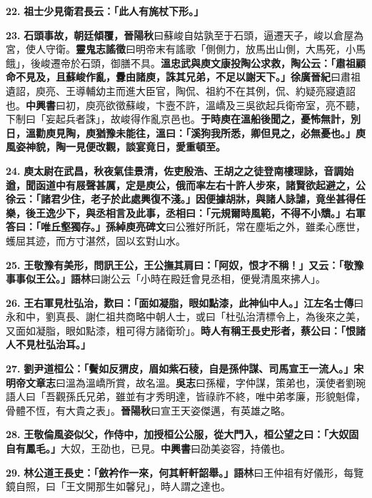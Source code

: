 \textbf{22.} \textbf{祖士少見衛君長云：「此人有旄杖下形。」}

\textbf{23.} \textbf{石頭事故，朝廷傾覆，}{\footnotesize \textbf{晉陽秋}曰蘇峻自姑孰至于石頭，逼遷天子，峻以倉屋為宮，使人守衛。\textbf{靈鬼志謠徵}曰明帝末有謠歌「側側力，放馬出山側，大馬死，小馬餓」，後峻遷帝於石頭，御膳不具。}\textbf{溫忠武與庾文康投陶公求救，陶公云：「肅祖顧命不見及，且蘇峻作亂，釁由諸庾，誅其兄弟，不足以謝天下。」}{\footnotesize \textbf{徐廣晉紀}曰肅祖遺詔，庾亮、王導輔幼主而進大臣官，陶侃、祖約不在其例，侃、約疑亮寢遺詔也。\textbf{中興書}曰初，庾亮欲徵蘇峻，卞壼不許，溫嶠及三吳欲起兵衛帝室，亮不聽，下制曰「妄起兵者誅」，故峻得作亂京邑也。}\textbf{于時庾在溫船後聞之，憂怖無計，別日，溫勸庾見陶，庾猶豫未能往，溫曰：「溪狗我所悉，卿但見之，必無憂也。」庾風姿神貌，陶一見便改觀，談宴竟日，愛重頓至。}

\textbf{24.} \textbf{庾太尉在武昌，秋夜氣佳景清，佐吏殷浩、王胡之之徒登南樓理詠，音調始遒，聞函道中有屐聲甚厲，定是庾公，俄而率左右十許人步來，諸賢欲起避之，公徐云：「諸君少住，老子於此處興復不淺。」因便據胡牀，與諸人詠謔，竟坐甚得任樂，後王逸少下，與丞相言及此事，丞相曰：「元規爾時風範，不得不小穨。」右軍答曰：「唯丘壑獨存。」}{\footnotesize \textbf{孫綽庾亮碑文}曰公雅好所託，常在塵垢之外，雖柔心應世，蠖屈其迹，而方寸湛然，固以玄對山水。}

\textbf{25.} \textbf{王敬豫有美形，問訊王公，王公撫其肩曰：「阿奴，恨才不稱！」又云：「敬豫事事似王公。」}{\footnotesize \textbf{語林}曰謝公云「小時在殿廷會見丞相，便覺清風來拂人」。}

\textbf{26.} \textbf{王右軍見杜弘治，歎曰：「面如凝脂，眼如點漆，此神仙中人。」}{\footnotesize \textbf{江左名士傳}曰永和中，劉真長、謝仁祖共商略中朝人士，或曰「杜弘治清標令上，為後來之美，又面如凝脂，眼如點漆，粗可得方諸衛玠」。}\textbf{時人有稱王長史形者，蔡公曰：「恨諸人不見杜弘治耳。」}

\textbf{27.} \textbf{劉尹道桓公：「鬢如反猬皮，眉如紫石稜，自是孫仲謀、司馬宣王一流人。」}{\footnotesize \textbf{宋明帝文章志}曰溫為溫嶠所賞，故名溫。\textbf{吳志}曰孫權，字仲謀，策弟也，漢使者劉琬語人曰「吾觀孫氏兄弟，雖並有才秀明達，皆祿祚不終，唯中弟孝廉，形貌魁偉，骨體不恆，有大貴之表」。\textbf{晉陽秋}曰宣王天姿傑邁，有英雄之略。}

\textbf{28.} \textbf{王敬倫風姿似父，作侍中，加授桓公公服，從大門入，桓公望之曰：「大奴固自有鳳毛。」}{\footnotesize 大奴，王劭也，已見。\textbf{中興書}曰劭美姿容，持儀也。}

\textbf{29.} \textbf{林公道王長史：「斂衿作一來，何其軒軒韶舉。」}{\footnotesize \textbf{語林}曰王仲祖有好儀形，每覽鏡自照，曰「王文開那生如馨兒」，時人謂之達也。}

